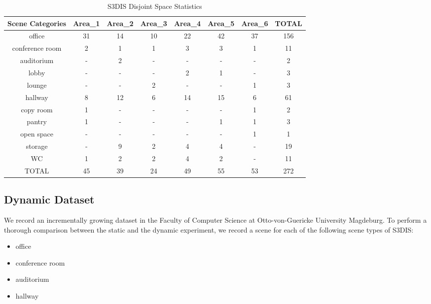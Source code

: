\documentclass[main.tex]{subfiles}
\begin{document}
\begin{table}[H]
    \centering
    \begin{tabular}{c|c|c|c|c|c|c|c}
        \hline
        Scene Categories & Area\_1 & Area\_2 & Area\_3 & Area\_4 & Area\_5 & Area\_6 & TOTAL \\ \hline
        office           & 31      & 14      & 10      & 22      & 42      & 37      & 156   \\ \hline
        conference room  & 2       & 1       & 1       & 3       & 3       & 1       & 11    \\ \hline
        auditorium       & -       & 2       & -       & -       & -       & -       & 2     \\ \hline
        lobby            & -       & -       & -       & 2       & 1       & -       & 3     \\ \hline
        lounge           & -       & -       & 2       & -       & -       & 1       & 3     \\ \hline
        hallway          & 8       & 12      & 6       & 14      & 15      & 6       & 61    \\ \hline
        copy room        & 1       & -       & -       & -       & -       & 1       & 2     \\ \hline
        pantry           & 1       & -       & -       & -       & 1       & 1       & 3     \\ \hline
        open space       & -       & -       & -       & -       & -       & 1       & 1     \\ \hline
        storage          & -       & 9       & 2       & 4       & 4       & -       & 19    \\ \hline
        WC               & 1       & 2       & 2       & 4       & 2       & -       & 11    \\ \hline
        TOTAL            & 45      & 39      & 24      & 49      & 55      & 53      & 272   \\
    \end{tabular}
    \caption{S3DIS Disjoint Space Statistics}
    \label{tab:stanfordStats}
\end{table}

\subsection{Dynamic Dataset}
We record an incrementally growing dataset in the Faculty of Computer Science at Otto-von-Guericke University Magdeburg.
To perform a thorough comparison between the static and the dynamic experiment, we record a scene for each of the following scene types of S3DIS:
\begin{itemize}
    \item office
    \item conference room
    \item auditorium
    \item hallway
\end{itemize}
\end{document}
